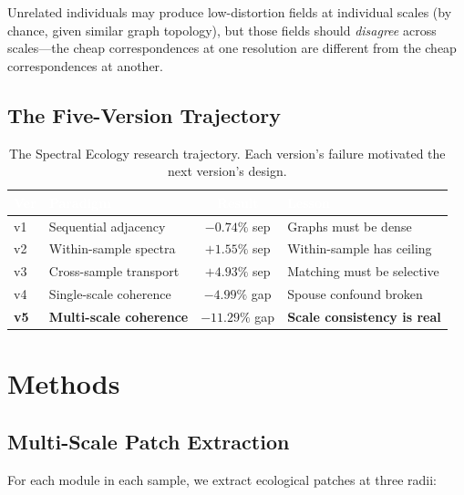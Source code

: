 \documentclass{../yalumba}
\begin{document}
Unrelated individuals may produce low-distortion fields at individual scales
(by chance, given similar graph topology), but those fields should
\emph{disagree} across scales---the cheap correspondences at one resolution
are different from the cheap correspondences at another.

\subsection{The Five-Version Trajectory}

\begin{table}[H]
  \centering
  \tablestyle
  \caption{The Spectral Ecology research trajectory.  Each version's failure
    motivated the next version's design.}
  \label{tab:trajectory}
  \begin{tabular}{llcl}
    \toprule
    \rowcolor{table-header}
    \textcolor{white}{\textbf{Ver}} &
    \textcolor{white}{\textbf{Paradigm}} &
    \textcolor{white}{\textbf{Result}} &
    \textcolor{white}{\textbf{Lesson}} \\
    \midrule
    v1 & Sequential adjacency & $-0.74\%$ sep & Graphs must be dense \\
    v2 & Within-sample spectra & $+1.55\%$ sep & Within-sample has ceiling \\
    v3 & Cross-sample transport & $+4.93\%$ sep & Matching must be selective \\
    v4 & Single-scale coherence & $-4.99\%$ gap & Spouse confound broken \\
    \textbf{v5} & \textbf{Multi-scale coherence} & $-11.29\%$ gap & \textbf{Scale consistency is real} \\
    \bottomrule
  \end{tabular}
\end{table}


\section{Methods}
\label{sec:methods}

\subsection{Multi-Scale Patch Extraction}

For each module in each sample, we extract ecological patches at three radii:
\end{document}
